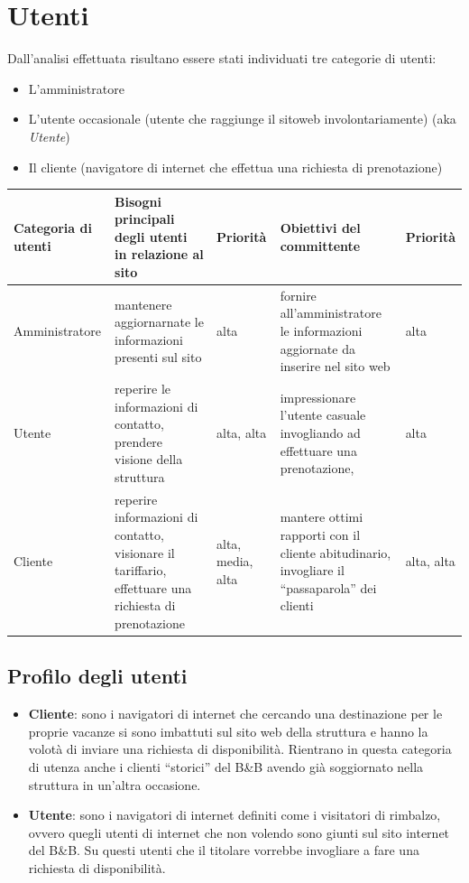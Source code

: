 \documentclass[a4paper,12pt,hidelinks]{report}
\begin{document}
\section{Utenti}
  Dall'analisi effettuata risultano essere stati individuati tre categorie di utenti:
  \begin{itemize}
    \item L'amministratore
    \item L'utente occasionale (utente che raggiunge il sitoweb involontariamente) (aka \textit{Utente})
    \item Il cliente (navigatore di internet che effettua una richiesta di prenotazione)
  \end{itemize}
  \begin{center}
    \begin{tabular}{||m{3cm}||m{4cm}|m{}||m{4cm}|m{}||}
      \hline
	\textbf{Categoria di utenti} & \textbf{Bisogni principali degli utenti in relazione al sito} & Priorità & \textbf{Obiettivi del committente} & Priorità \\
      \hline
	Amministratore & mantenere aggiornarnate le informazioni presenti sul sito & alta & fornire all'amministratore le informazioni aggiornate da inserire nel sito web & alta\\
      \hline
	Utente & reperire le informazioni di contatto, prendere visione della struttura
	      & alta, alta
	      & impressionare l'utente casuale invogliando ad effettuare una prenotazione,  & alta\\
      \hline  
	Cliente & reperire informazioni di contatto, visionare il tariffario, effettuare una richiesta di prenotazione & alta, media, alta & mantere ottimi rapporti con
	il cliente abitudinario, invogliare il ``passaparola'' dei clienti & alta, alta\\
      \hline
    \end{tabular}
  \end{center}
  \subsection{Profilo degli utenti}
    \begin{itemize}
    \item \textbf{Cliente}: sono i navigatori di internet che cercando una destinazione per le proprie vacanze si sono imbattuti sul sito web della struttura e hanno la volotà di inviare 
    una richiesta di disponibilità. Rientrano in questa categoria di utenza anche i clienti ``storici'' del B\&B avendo già soggiornato nella struttura in un'altra occasione.
    \item \textbf{Utente}: sono i navigatori di internet definiti come i visitatori di rimbalzo, ovvero quegli utenti di internet che non volendo sono giunti sul sito internet del B\&B. 
    Su questi utenti che il titolare vorrebbe invogliare a fare una richiesta di disponibilità.
    \end{itemize}
\end{document}
